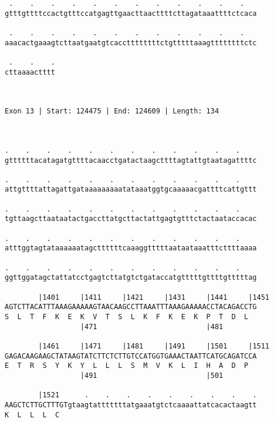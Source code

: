 \documentclass{article}
\begin{document}
\begin{Verbatim}
 .    .    .    .    .    .    .    .    .    .    .    .   
gtttgttttccactgtttccatgagttgaacttaacttttcttagataaattttctcaca
                                                            
 .    .    .    .    .    .    .    .    .    .    .    .   
aaacactgaaagtcttaatgaatgtcaccttttttttctgtttttaaagttttttttctc
                                                            
 .    .    .
cttaaaactttt
            
            
 
Exon 13 | Start: 124475 | End: 124609 | Length: 134



.    .    .    .    .    .    .    .    .    .    .    .    
gttttttacatagatgttttacaacctgatactaagcttttagtattgtaatagattttc
                                                            
.    .    .    .    .    .    .    .    .    .    .    .    
attgttttattagattgataaaaaaaaatataaatggtgcaaaaacgattttcattgttt
                                                            
.    .    .    .    .    .    .    .    .    .    .    .    
tgttaagcttaataatactgaccttatgcttactattgagtgtttctactaataccacac
                                                            
.    .    .    .    .    .    .    .    .    .    .    .    
atttggtagtataaaaaatagcttttttcaaaggtttttaataataaatttcttttaaaa
                                                            
.    .    .    .    .    .    .    .    .    .    .    .    
ggttggatagctattatcctgagtcttatgtctgataccatgtttttgttttgtttttag
                                                            
        |1401     |1411     |1421     |1431     |1441     |1451
AGTCTTACATTTAAAGAAAAAGTAACAAGCCTTAAATTTAAAGAAAAACCTACAGACCTG
S  L  T  F  K  E  K  V  T  S  L  K  F  K  E  K  P  T  D  L  
                  |471                          |481        
  
        |1461     |1471     |1481     |1491     |1501     |1511
GAGACAAGAAGCTATAAGTATCTTCTCTTGTCCATGGTGAAACTAATTCATGCAGATCCA
E  T  R  S  Y  K  Y  L  L  L  S  M  V  K  L  I  H  A  D  P  
                  |491                          |501        
  
        |1521      .    .    .    .    .    .    .    .    .
AAGCTCTTGCTTTGTgtaagtatttttttatgaaatgtctcaaaattatcacactaagtt
K  L  L  L  C                                               
                                                            

\end{Verbatim}
\end{document}
